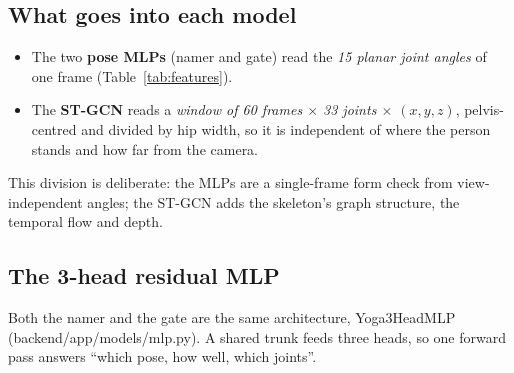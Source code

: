 \documentclass[11pt,a4paper]{article}
\newcommand{\ubrk}{\textunderscore\allowbreak}
\DeclareRobustCommand{\code}[1]{{\ttfamily\small\let\_\ubrk #1}}
\begin{document}
\subsection{What goes into each model}
\begin{itemize}
\item The two \textbf{pose MLPs} (namer and gate) read the \emph{15 planar joint angles} of one frame (Table~\ref{tab:features}).
\item The \textbf{ST-GCN} reads a \emph{window of 60 frames $\times$ 33 joints $\times$ $(x,y,z)$}, pelvis-centred and divided by hip width, so it is independent of where the person stands and how far from the camera.
\end{itemize}
This division is deliberate: the MLPs are a single-frame form check from view-independent angles; the ST-GCN adds the skeleton's graph structure, the temporal flow and depth.

\subsection{The 3-head residual MLP}
Both the namer and the gate are the same architecture, \code{Yoga3HeadMLP} (\code{backend/app/models/mlp.py}). A shared trunk feeds three heads, so one forward pass answers ``which pose, how well, which joints''.
\end{document}
